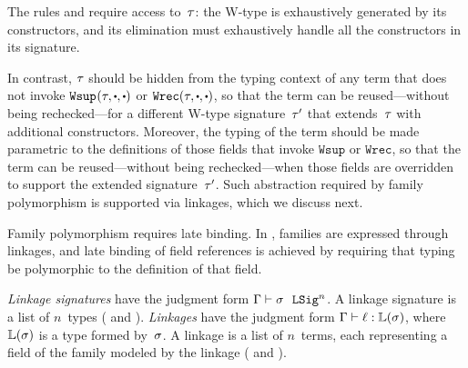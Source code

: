 

The rules  and  require access to~$\tau$:
the W-type is exhaustively generated by its constructors, and
its elimination must exhaustively handle all the constructors in
its signature.

In contrast, $\tau$ should be hidden from the typing context of any
term that does not invoke $\Wsup{}{\wsig}{\cDot}{\cDot}$ or $\Wrec{\wsig}{\cDot}{\cDot}$, so that
the term can be reused---without being rechecked---for a different
W-type signature~$\tau'$ that extends~$\tau$ with additional
constructors.
Moreover, the typing of the term should be made parametric to
the definitions of those fields that invoke $\texttt{Wsup}$ or $\texttt{Wrec}$,
so that the term can be reused---without being rechecked---when those fields
are overridden to support the extended signature~$\tau'$.
%
Such abstraction required by family polymorphism is supported via linkages,
which we discuss next.



Family polymorphism requires late binding.
In \TT, families are expressed through linkages, and late binding of
field references is achieved by requiring that typing be polymorphic to
the definition of that field.

\emph{Linkage signatures} have the judgment form $ {\Gamma} \vdash {\ensuremath{\sigma}} \ \ \texttt{LSig}^{n} $.
A linkage signature is a list of $n$~types
( and ).
%
\emph{Linkages} have the judgment form $ {\Gamma} \vdash {\ensuremath{\ell}} : {\mathbb{L}({\sigma})} $,
where $\mathbb{L}({\sigma})$ is a type formed by~$\sigma$.
A linkage is a list of $n$~terms, each representing a field of the family
modeled by the linkage ( and ).

